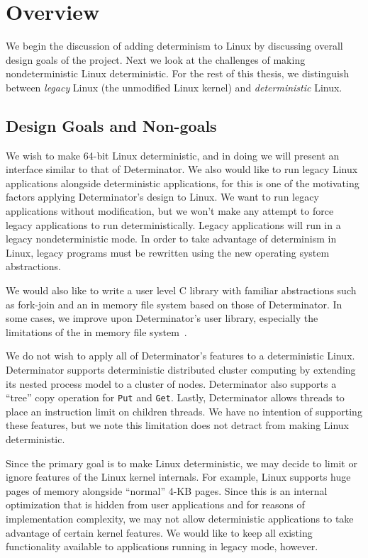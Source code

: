 \section{Overview}

We begin the discussion of adding determinism to Linux by discussing overall
design goals of the project. Next we look at the challenges of making
nondeterministic Linux deterministic. For the rest of this thesis, we
distinguish between \emph{legacy} Linux (the unmodified Linux kernel) and
\emph{deterministic} Linux.

\subsection{Design Goals and Non-goals}

We wish to make 64-bit Linux deterministic, and in doing we will present an
interface similar to that of Determinator. We also would like to run legacy
Linux applications alongside deterministic applications, for this is one of the
motivating factors applying Determinator's design to Linux. We want to run
legacy applications without modification, but we won't make any attempt to force
legacy applications to run deterministically. Legacy applications will run in a
legacy nondeterministic mode. In order to take advantage of determinism in
Linux, legacy programs must be rewritten using the new operating system
abstractions.

We would also like to write a user level C library with familiar abstractions
such as fork-join and an in memory file system based on those of Determinator.
In some cases, we improve upon Determinator's user library, especially the
limitations of the in memory file system~\cite{Aviram10,Aviram10cloud}.

We do not wish to apply all of Determinator's features to a deterministic Linux.
Determinator supports deterministic distributed cluster computing by extending
its nested process model to a cluster of nodes. Determinator also supports a
``tree'' copy operation for {\tt Put} and {\tt Get}. Lastly, Determinator allows
threads to place an instruction limit on children threads. We have no intention
of supporting these features, but we note this limitation does not detract from
making Linux deterministic.

Since the primary goal is to make Linux deterministic, we may decide
to limit or ignore features of the Linux kernel internals. For example, Linux
supports huge pages of memory alongside ``normal'' 4-KB pages. Since this is an
internal optimization that is hidden from user applications and for reasons of
implementation complexity, we may not allow deterministic applications to take
advantage of certain kernel features. We would like to keep all existing
functionality available to applications running in legacy mode, however.

